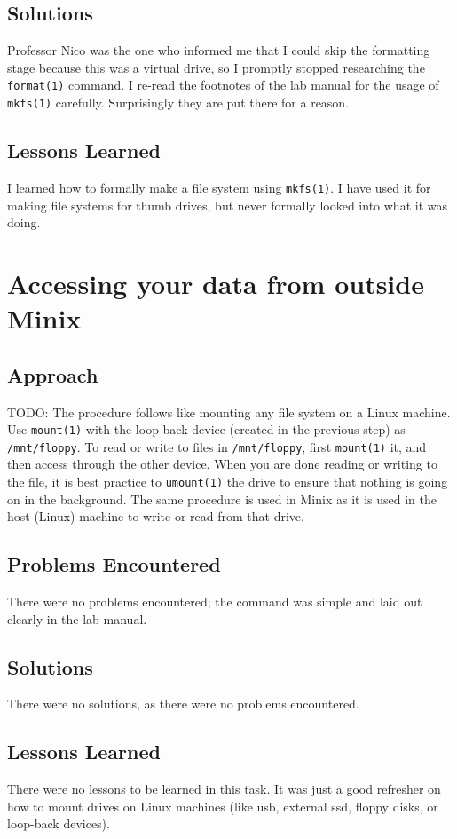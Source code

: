 \documentclass[11pt]{article}
\begin{document}
\subsection{Solutions}
Professor Nico was the one who informed me that I could skip the formatting stage because this was a virtual drive, so I promptly stopped researching the {\tt format(1)} command. I re-read the footnotes of the lab manual for the usage of {\tt mkfs(1)} carefully. Surprisingly they are put there for a reason. 

\subsection{Lessons Learned}
I learned how to formally make a file system using {\tt mkfs(1)}. I have used it for making file systems for thumb drives, but never formally looked into what it was doing.

\section{Accessing your data from outside {\sc Minix}}
\subsection{Approach}
TODO:
The procedure follows like mounting any file system on a Linux machine. Use {\tt mount(1)} with the loop-back device (created in the previous step) as {\tt /mnt/floppy}. To read or write to files in {\tt /mnt/floppy}, first {\tt mount(1)} it, and then access through the other device. When you are done reading or writing to the file, it is best practice to {\tt umount(1)} the drive to ensure that nothing is going on in the background. The same procedure is used in {\sc Minix} as it is used in the host (Linux) machine to write or read from that drive.

\subsection{Problems Encountered}
There were no problems encountered; the command was simple and laid out clearly in the lab manual.

\subsection{Solutions}
There were no solutions, as there were no problems encountered.

\subsection{Lessons Learned}
There were no lessons to be learned in this task. It was just a good refresher on how to mount drives on Linux machines (like usb, external ssd, floppy disks, or loop-back devices).
\end{document}
